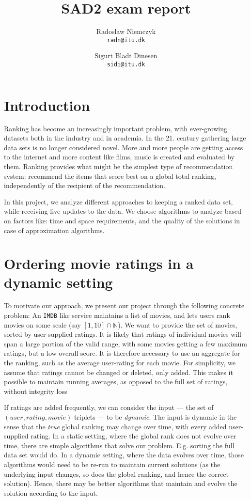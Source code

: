 \documentclass[a4paper, titlepage]{report}
\renewcommand{\%}{\scalebox{.9}{\oldpct}}
\begin{document}
\title{SAD2 exam report}
\author{
	Radoslaw Niemczyk
	\\\texttt{radn@itu.dk}
	\and
	Sigurt Bladt Dinesen
	\\\texttt{sidi@itu.dk}
}

\maketitle

\section*{Introduction}
Ranking has become an increasingly important problem, with ever-growing datasets
both in the industry and in academia. In the 21. century gathering large data
sets is no longer considered novel. More and more people are getting access to
the internet and more content like films, music is created and evaluated by
them.
Ranking provides what might be the simplest type of recommendation system:
recommend the items that score best on a global total ranking, independently of
the recipient of the recommendation.

In this project, we analyze different approaches to keeping a ranked data set,
while receiving live updates to the data. We choose algorithms to analyze based
on factors like: time and space requirements, and the quality of the solutions
in case of approximation algorithms.

\section*{Ordering movie ratings in a dynamic setting}
To motivate our approach, we present our project through the following concrete
problem: An \texttt{IMDB} like service maintains a list of movies, and lets
users rank movies on some scale (say $\left[1,10\right]\cap \mathbb{N}$). We
want to provide the set of movies, sorted by user-supplied ratings. It is likely
that ratings of individual movies will span a large portion of the valid range, with
some movies getting a few maximum ratings, but a low overall score. It is
therefore necessary to use an aggregate for the ranking, such as the average
user-rating for each movie. For simplicity, we assume that ratings cannot be
changed or deleted, only added. This makes it possible to maintain running
averages, as
opposed to the full set of ratings, without integrity loss

If ratings are added frequently, we can consider the input --- the set of
$(user, rating, movie)$ triplets --- to be \textit{dynamic}. The input is dynamic
in the sense that the \textit{true} global ranking may change over time, with
every added user-supplied rating.
In a static setting, where the global rank does not evolve over time, there are
simple algorithms that solve our problem. E.g. sorting the full data set would
do.
In a dynamic setting, where the data evolves over time,
those algorithms would need to be re-run to maintain current solutions (as the
underlying input changes, so does the global ranking, and hence the correct
solution). Hence, there may be better algorithms that maintain and evolve the
solution according to the input.
\end{document}
